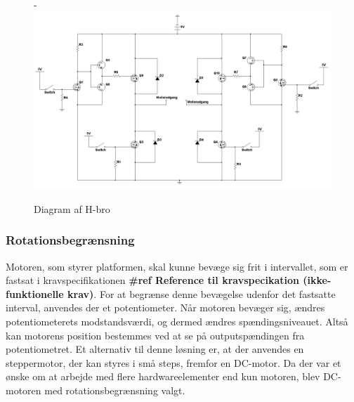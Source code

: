 \begin{figure}[H]
	\begin{adjustwidth}{-3cm}{-\rightmargin}
	\centering
	\includegraphics[width=0.9\paperwidth]{Afsnit/DesignOgImplementering/images/H-bro}
	\caption{Diagram af H-bro}
	\label{fig:hbro}
	\end{adjustwidth}
\end{figure}

\subsubsection{Rotationsbegrænsning}
Motoren, som styrer platformen, skal kunne bevæge sig frit i intervallet, som er fastsat i kravspecifikationen \textbf{\#ref Reference til kravspecikation (ikke-funktionelle krav)}. For at begrænse denne bevægelse udenfor det fastsatte interval, anvendes der et potentiometer. Når motoren bevæger sig, ændres potentiometerets modstandsværdi, og dermed ændres spændingsniveauet. Altså kan motorens position bestemmes ved at se på outputspændingen fra potentiometret. Et alternativ til denne løsning er, at der anvendes en steppermotor, der kan styres i små steps, fremfor en DC-motor. Da der var et ønske om at arbejde med flere hardwareelementer end kun motoren, blev DC-motoren med rotationsbegrænsning valgt.


